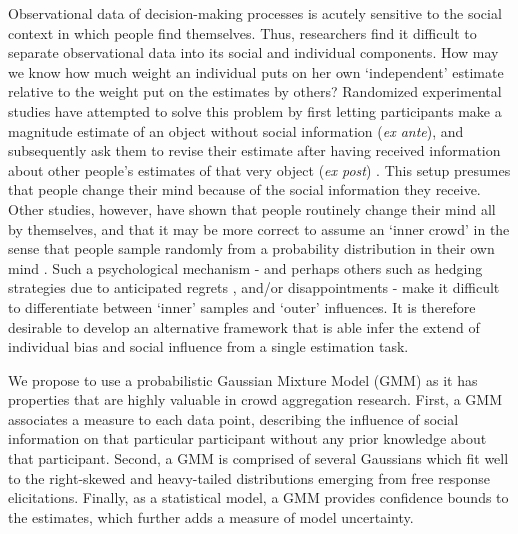 \documentclass[9pt,a4paper,twocolumn,lineno]{article}
\begin{document}
Observational data of decision-making processes is acutely sensitive to the social context in which people find themselves. Thus, researchers find it difficult to separate observational data into its social and individual components. How may we know how much weight an individual puts on her own ‘independent’ estimate relative to the weight put on the estimates by others? Randomized experimental studies have attempted to solve this problem by first letting participants make a magnitude estimate of an object without social information (\textit{ex ante}), and subsequently ask them to revise their estimate after having received information about other people’s estimates of that very object (\textit{ex post}) \cite{becker2017network, jayles2017social, lorenz2011social, sniezek1995cueing, mavrodiev2013quantifying}. This setup %
presumes that people change their mind because of the social information they receive. Other studies, however, have shown that people routinely change their mind all by themselves, and that it may be more correct to assume an `inner crowd' in the sense that people sample randomly from a probability distribution in their own mind \cite{vul2008measuring, herzog2009wisdom, herzog2014harnessing}. Such a psychological mechanism - and perhaps others such as hedging strategies due to anticipated regrets \cite{bell1982regret}, and/or disappointments \cite{loomes1986disappointment} - make it difficult to differentiate between `inner' samples and `outer' influences. It is therefore desirable to develop an alternative framework that is able infer the extend of individual bias and social influence from a single estimation task.

We propose to use a probabilistic Gaussian Mixture Model (GMM) as it has properties that are highly valuable in crowd aggregation research. First, a GMM associates a measure to each data point, describing the influence of social information on that particular participant without any prior knowledge about that participant. Second, a GMM is comprised of several Gaussians which fit well to the right-skewed and heavy-tailed distributions emerging from free response elicitations. Finally, as a statistical model, a GMM provides confidence bounds to the estimates, which further adds a measure of model uncertainty.
\end{document}
